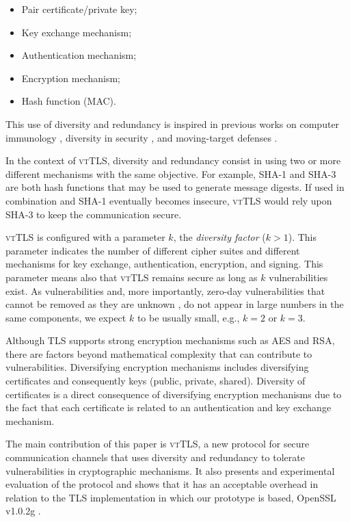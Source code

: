 \documentclass{sig-alternate-05-2015}
\begin{document}
\begin{itemize}
\item{Pair certificate/private key;}
\item{Key exchange mechanism;}
\item{Authentication mechanism;}
\item{Encryption mechanism;}
\item{Hash function (MAC).}
\end{itemize}


This use of diversity and redundancy is inspired in previous works on computer immunology \cite{Forrest1997}, diversity in security \cite{Littlewood2004,Garcia:11}, and moving-target defenses \cite{Carvalho2014}.

In the context of \textsc{vtTLS}, diversity and redundancy consist in using two or more different mechanisms with the same objective. For example, SHA-1 and SHA-3 are both hash functions that may be used to generate message digests. If used in combination and  SHA-1 eventually becomes insecure, \textsc{vtTLS} would rely upon SHA-3 to keep the communication secure. %

\textsc{vtTLS} is configured with a parameter $k$, the \emph{diversity factor} ($k>1$). This parameter indicates the number of different cipher suites and different mechanisms for key exchange, authentication, encryption, and signing. This parameter means also that \textsc{vtTLS} remains secure as long as $k$ vulnerabilities exist. As vulnerabilities and, more importantly, zero-day vulnerabilities that cannot be removed as they are unknown \cite{Bilge:12}, do not appear in large numbers in the same components, we expect $k$ to be usually small, e.g., $k=2$ or $k=3$. 

Although TLS supports strong encryption mechanisms such as AES and RSA, there are factors beyond mathematical complexity that can contribute to vulnerabilities.
Diversifying encryption mechanisms includes diversifying certificates and consequently keys (public, private, shared).
Diversity of certificates is a direct consequence of diversifying encryption mechanisms due to the fact that each certificate is related to an authentication and key exchange mechanism.

The main contribution of this paper is \textsc{vtTLS}, a new protocol for secure communication channels that uses diversity and redundancy to tolerate vulnerabilities in cryptographic mechanisms. It also presents and experimental evaluation of the protocol and shows that it has an acceptable overhead in relation to the TLS implementation in which our prototype is based, OpenSSL v1.0.2g \cite{viega2002network}.
\end{document}
